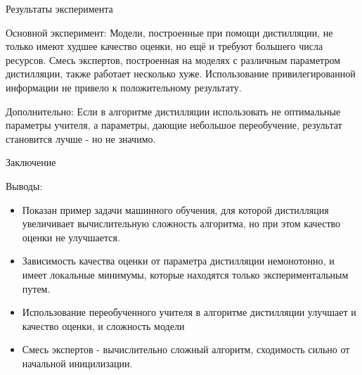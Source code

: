 \documentclass{beamer}
\begin{document}
\begin{frame}{Результаты эксперимента}
\begin{block}{Основной эксперимент:}
Модели, построенные при помощи дистилляции, не только имеют худшее качество оценки, но ещё и  требуют большего числа ресурсов. Смесь экспертов, построенная на моделях с различным параметром дистилляции, также работает несколько хуже. 
Использование привилегированной информации не привело к положительному результату.
\end{block}

\begin{block}{Дополнительно:}
 Если в алгоритме дистилляции использовать не оптимальные параметры учителя, а параметры, дающие небольшое переобучение, результат становится лучше - но не значимо.
\end{block}

\end{frame}


\begin{frame}{Заключение}
\begin{block}{Выводы:}
\begin{itemize}
  \item Показан пример задачи машинного обучения, для которой дистилляция увеличивает вычислительную сложность алгоритма, но при этом качество оценки не улучшается.

  \item Зависимость качества оценки от параметра дистилляции немонотонно, и имеет локальные минимумы, которые находятся только экспериментальным путем.

\item Использование переобученного учителя в алгоритме дистилляции улучшает и качество оценки, и сложность модели

 \item Смесь экспертов - вычислительно сложный алгоритм, сходимость сильно от начальной иницилизации.

\end{itemize}
\end{block}
\end{frame}
\end{document}
